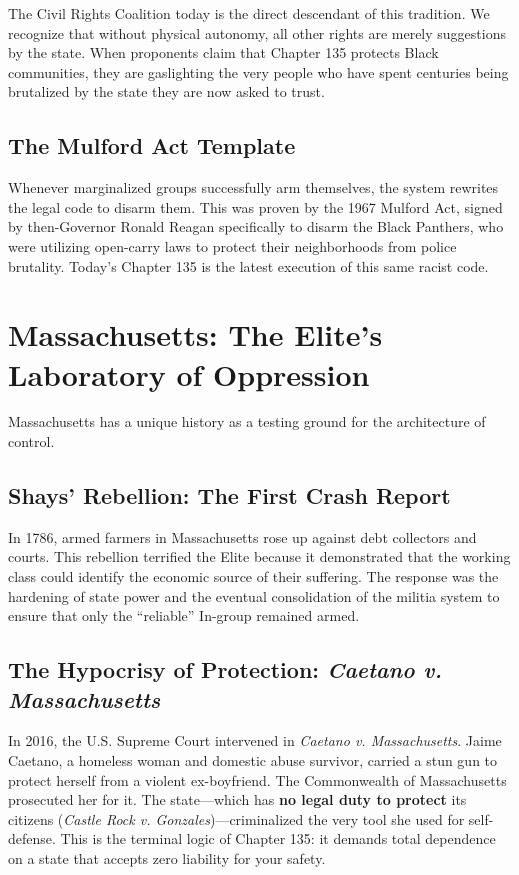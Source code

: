 \documentclass[12pt]{article}
\begin{document}
The Civil Rights Coalition today is the direct descendant of this tradition. We recognize that without physical autonomy, all other rights are merely suggestions by the state. When proponents claim that Chapter 135 protects Black communities, they are gaslighting the very people who have spent centuries being brutalized by the state they are now asked to trust.

\subsection{The Mulford Act Template}
Whenever marginalized groups successfully arm themselves, the system rewrites the legal code to disarm them. This was proven by the 1967 Mulford Act, signed by then-Governor Ronald Reagan specifically to disarm the Black Panthers, who were utilizing open-carry laws to protect their neighborhoods from police brutality. Today's Chapter 135 is the latest execution of this same racist code.

\section{Massachusetts: The Elite's Laboratory of Oppression}
Massachusetts has a unique history as a testing ground for the architecture of control.

\subsection{Shays' Rebellion: The First Crash Report}
In 1786, armed farmers in Massachusetts rose up against debt collectors and courts. This rebellion terrified the Elite because it demonstrated that the working class could identify the economic source of their suffering. The response was the hardening of state power and the eventual consolidation of the militia system to ensure that only the ``reliable'' In-group remained armed.

\subsection{The Hypocrisy of Protection: \textit{Caetano v. Massachusetts}}
In 2016, the U.S. Supreme Court intervened in \textit{Caetano v. Massachusetts}. Jaime Caetano, a homeless woman and domestic abuse survivor, carried a stun gun to protect herself from a violent ex-boyfriend. The Commonwealth of Massachusetts prosecuted her for it. The state—which has \textbf{no legal duty to protect} its citizens (\textit{Castle Rock v. Gonzales})—criminalized the very tool she used for self-defense. This is the terminal logic of Chapter 135: it demands total dependence on a state that accepts zero liability for your safety.
\end{document}
